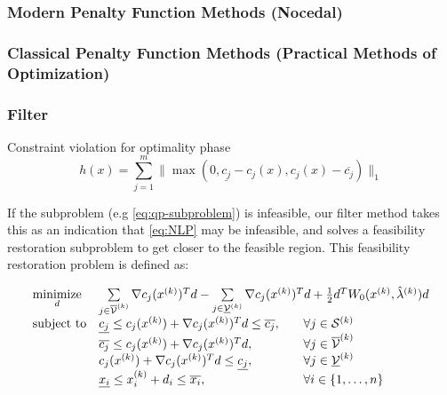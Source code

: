 
\subsubsection{Modern Penalty Function Methods (Nocedal)}

\subsubsection{Classical Penalty Function Methods (Practical Methods of Optimization)}

\subsubsection{Filter}

Constraint violation for optimality phase
\begin{equation}
h(x) = \sum\limits_{j=1}^m \bigg\lVert \max(0, \underline{c_j} - c_j(x), c_j(x) - \overline{c_j}) \bigg\rVert_1
\end{equation}

If the subproblem (e.g \ref{eq:qp-subproblem}) is infeasible, our filter method takes this as an indication that
\eqref{eq:NLP} may be infeasible, and solves a feasibility restoration subproblem to get closer to the
feasible region. This feasibility restoration problem is defined as:

\begin{equation}
\label{eq:restoration-subproblem}
\begin{array}{llll}
\underset{d}{\text{minimize}} 	& \multicolumn{3}{l}{\sum\limits_{j \in \overline{\mathcal{V}}^{(k)}} \nabla c_j(x^{(k)})^T d - \sum\limits_{j \in \underline{\mathcal{V}}^{(k)}} \nabla c_j(x^{(k)})^T d + \frac{1}{2} d^T W_0(x^{(k)}, \hat{\lambda}^{(k)}) d} \\
\text{subject to} 		& \underline{c_j} \le c_j(x^{(k)}) + \nabla c_j(x^{(k)})^T d \le \overline{c_j}, & & \forall j \in \mathcal{S}^{(k)} \\
				& \overline{c_j} \le c_j(x^{(k)}) + \nabla c_j(x^{(k)})^T d, & & \forall j \in \overline{\mathcal{V}}^{(k)} \\
				& c_j(x^{(k)}) + \nabla c_j(x^{(k)})^T d \le \underline{c_j}, & & \forall j \in \underline{\mathcal{V}}^{(k)} \\
				& \underline{x_i} \le x_i^{(k)} + d_i \le \overline{x_i}, & & \forall i \in \{1, \ldots, n\} \\
\end{array}
\end{equation}

